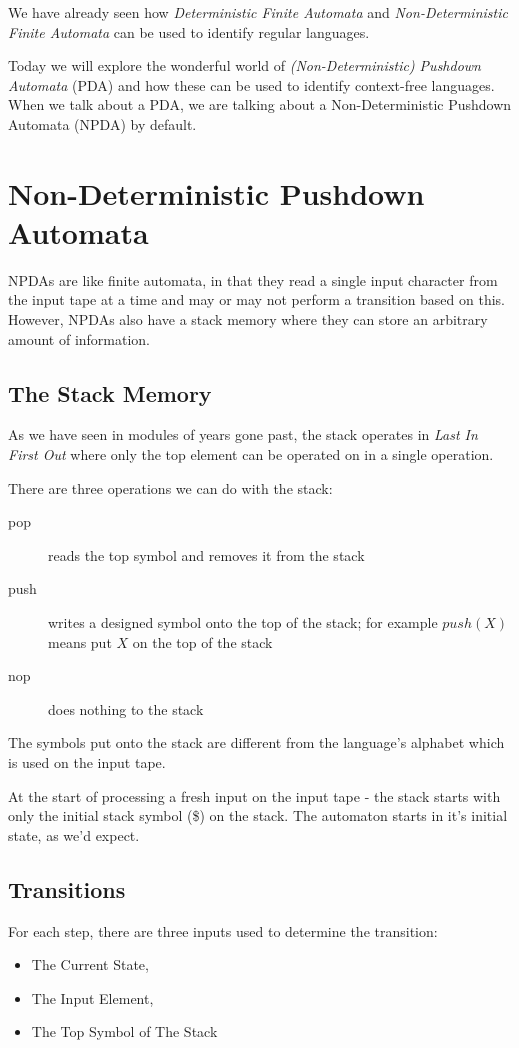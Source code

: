 
We have already seen how \textit{Deterministic Finite Automata} and \textit{Non-Deterministic Finite Automata} can be used to identify regular languages. 

Today we will explore the wonderful world of \textit{(Non-Deterministic) Pushdown Automata} (PDA) and how these can be used to identify context-free languages. When we talk about a PDA, we are talking about a Non-Deterministic Pushdown Automata (NPDA) by default.

\section{Non-Deterministic Pushdown Automata}
NPDAs are like finite automata, in that they read a single input character from the input tape at a time and may or may not perform a transition based on this. However, NPDAs also have a stack memory where they can store an arbitrary amount of information.

\subsection{The Stack Memory}
As we have seen in modules of years gone past, the stack operates in \textit{Last In First Out} where only the top element can be operated on in a single operation. 

There are three operations we can do with the stack:
\begin{description}
    \item[pop] reads the top symbol and removes it from the stack
    \item[push] writes a designed symbol onto the top of the stack; for example $push(X)$ means put $X$ on the top of the stack
    \item[nop] does nothing to the stack 
\end{description}

The symbols put onto the stack are different from the language's alphabet which is used on the input tape.

At the start of processing a fresh input on the input tape - the stack starts with only the initial stack symbol (\$) on the stack. The automaton starts in it's initial state, as we'd expect.

\subsection{Transitions}
For each step, there are three inputs used to determine the transition:
\begin{itemize}
    \item The Current State,
    \item The Input Element,
    \item The Top Symbol of The Stack
\end{itemize}

